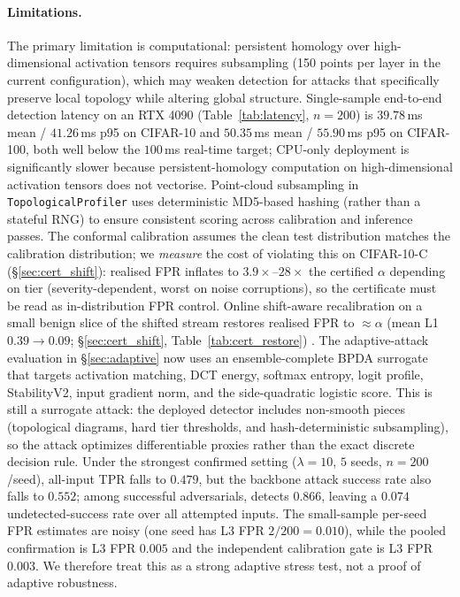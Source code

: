 \paragraph{Limitations.}
The primary limitation is computational: persistent homology over 
high-dimensional activation tensors requires subsampling 
(150 points per layer in the current configuration), which may weaken detection for attacks
that specifically preserve local topology while altering global structure.
Single-sample end-to-end detection latency on an RTX 4090
(Table~\ref{tab:latency}, $n=200$) is $39.78$\,ms mean / $41.26$\,ms
p95 on CIFAR-10 and $50.35$\,ms mean / $55.90$\,ms p95 on CIFAR-100,
both well below the $100$\,ms real-time target; CPU-only deployment is
significantly slower because persistent-homology computation on
high-dimensional activation tensors does not vectorise.
Point-cloud subsampling in \texttt{TopologicalProfiler} uses
deterministic MD5-based hashing (rather than a stateful RNG) to ensure
consistent scoring across calibration and inference passes.
The conformal calibration assumes the clean test distribution matches
the calibration distribution; we \emph{measure} the cost of violating
this on CIFAR-10-C (\S\ref{sec:cert_shift}): realised FPR inflates to
$3.9\times$--$28\times$ the certified $\alpha$ depending on tier
(severity-dependent, worst on noise corruptions), so the certificate
must be read as in-distribution FPR control. Online shift-aware
recalibration on a small benign slice of the shifted stream restores
realised FPR to ${\approx}\alpha$ (mean L1 $0.39{\to}0.09$;
\S\ref{sec:cert_shift}, Table~\ref{tab:cert_restore})
\cite{tibshirani2019conformal}.
The adaptive-attack evaluation in \S\ref{sec:adaptive} now uses an
ensemble-complete BPDA surrogate that targets activation matching, DCT
energy, softmax entropy, logit profile, StabilityV2, input gradient norm,
and the side-quadratic logistic score. This is still a surrogate attack:
the deployed detector includes non-smooth pieces (topological diagrams,
hard tier thresholds, and hash-deterministic subsampling), so the attack
optimizes differentiable proxies rather than the exact discrete decision
rule. Under the strongest confirmed setting ($\lambda{=}10$, $5$ seeds,
$n{=}200$/seed), all-input TPR falls to $0.479$, but the backbone attack
success rate also falls to $0.552$; among successful adversarials,
\prism detects $0.866$, leaving a $0.074$ undetected-success rate over
all attempted inputs. The small-sample per-seed FPR estimates are noisy
(one seed has L3 FPR $2/200=0.010$), while the pooled confirmation is
L3 FPR $0.005$ and the independent calibration gate is L3 FPR $0.003$.
We therefore treat this as a strong adaptive stress test, not a proof of
adaptive robustness.

